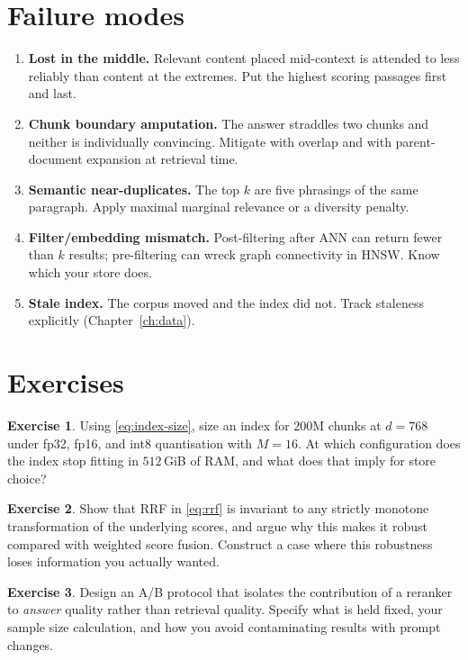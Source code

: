 \documentclass[11pt,twoside,openright]{book}
\theoremstyle{definition}
\newtheorem{exercise}{Exercise}[chapter]
\theoremstyle{plain}
\theoremstyle{remark}
\newcommand{\term}[1]{\textbf{#1}}
\begin{document}
\section{Failure modes}

\begin{enumerate}[leftmargin=1.6em]
  \item \term{Lost in the middle.} Relevant content placed mid-context is
        attended to less reliably than content at the extremes. Put the highest
        scoring passages first and last.
  \item \term{Chunk boundary amputation.} The answer straddles two chunks and
        neither is individually convincing. Mitigate with overlap and with
        parent-document expansion at retrieval time.
  \item \term{Semantic near-duplicates.} The top $k$ are five phrasings of the
        same paragraph. Apply maximal marginal relevance or a diversity penalty.
  \item \term{Filter/embedding mismatch.} Post-filtering after ANN can return
        fewer than $k$ results; pre-filtering can wreck graph connectivity in
        HNSW. Know which your store does.
  \item \term{Stale index.} The corpus moved and the index did not. Track
        staleness explicitly (Chapter~\ref{ch:data}).
\end{enumerate}

\section{Exercises}

\begin{exercise}
Using \eqref{eq:index-size}, size an index for $200$M chunks at $d=768$ under
fp32, fp16, and int8 quantisation with $M=16$. At which configuration does the
index stop fitting in $512$\,GiB of RAM, and what does that imply for store
choice?
\end{exercise}

\begin{exercise}
Show that RRF in \eqref{eq:rrf} is invariant to any strictly monotone
transformation of the underlying scores, and argue why this makes it robust
compared with weighted score fusion. Construct a case where this robustness
loses information you actually wanted.
\end{exercise}

\begin{exercise}
Design an A/B protocol that isolates the contribution of a reranker to
\emph{answer} quality rather than retrieval quality. Specify what is held fixed,
your sample size calculation, and how you avoid contaminating results with
prompt changes.
\end{exercise}
\end{document}
